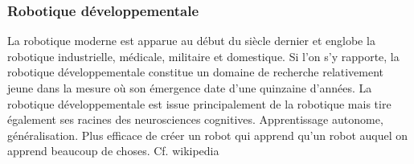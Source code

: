 \documentclass{llncs}
\begin{document}

\subsubsection{Robotique développementale}
La robotique moderne est apparue au début du siècle dernier et englobe la robotique industrielle, médicale, militaire et domestique. Si l'on s'y rapporte, la robotique développementale constitue un domaine de recherche relativement jeune dans la mesure où son émergence date d'une quinzaine d'années. La robotique développementale est issue principalement de la robotique mais tire également ses racines des neurosciences cognitives.
Apprentissage autonome, généralisation.
Plus efficace de créer un robot qui apprend qu'un robot auquel on apprend beaucoup de choses.
Cf. wikipedia




\end{document}
